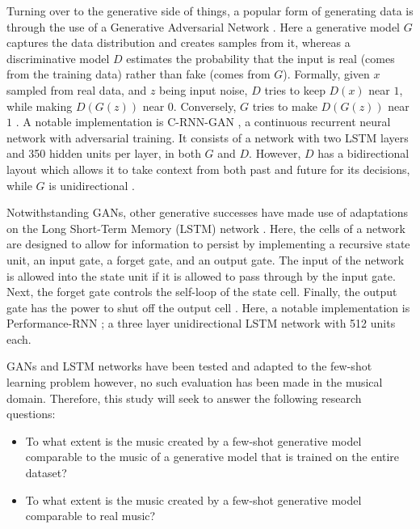 \documentclass[11pt, a4paper, man, floatsintext]{apa6}
\begin{document}
Turning over to the generative side of things, a popular form of generating data is through the use of a Generative Adversarial Network \parencite[GAN;][]{goodfellow_generative_2014}. Here a generative model $G$ captures the data distribution and creates samples from it, whereas a discriminative model $D$ estimates the probability that the input is real (comes from the training data) rather than fake (comes from $G$). Formally, given $x$ sampled from real data, and $z$ being input noise, $D$ tries to keep $D(x)$ near $1$, while making $D(G(z))$ near $0$. Conversely, $G$ tries to make $D(G(z))$ near $1$ \parencite{goodfellow_nips_2016}. A notable implementation is C-RNN-GAN \parencite{mogren_c-rnn-gan_2016}, a continuous recurrent neural network with adversarial training. It consists of a network with two LSTM layers and 350 hidden units per layer, in both $G$ and $D$. However, $D$ has a bidirectional layout which allows it to take context from both past and future for its decisions, while $G$ is unidirectional \parencite{mogren_c-rnn-gan_2016}.

Notwithstanding GANs, other generative successes have made use of adaptations on the Long Short-Term Memory (LSTM) network \parencite{hochreiter_long_1997}. Here, the cells of a network are designed to allow for information to persist by implementing a recursive state unit, an input gate, a forget gate, and an output gate. The input of the network is allowed into the state unit if it is allowed to pass through by the input gate. Next, the forget gate controls the self-loop of the state cell. Finally, the output gate has the power to shut off the output cell \parencite{goodfellow_deep_2016}. Here, a notable implementation is Performance-RNN \parencite{oore_this_2018}; a three layer unidirectional LSTM network with 512 units each.

GANs and LSTM networks have been tested and adapted to the few-shot learning problem \parencite[see][]{zhang_metagan_2018, vinyals_matching_2016} however, no such evaluation has been made in the musical domain. Therefore, this study will seek to answer the following research questions:

\begin{itemize}
    \item To what extent is the music created by a few-shot generative model comparable to the music of a generative model that is trained on the entire dataset?
    \item To what extent is the music created by a few-shot generative model comparable to real music?
\end{itemize}
\end{document}
